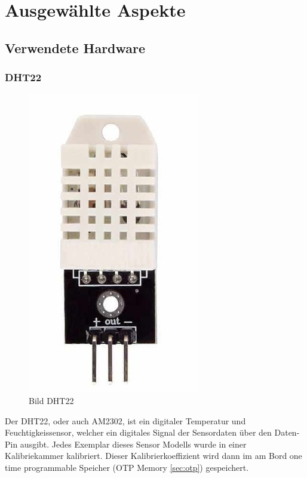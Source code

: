 \chapter{Ausgewählte Aspekte}

\section{Verwendete Hardware}

\subsection{DHT22}

\begin{figure}[H]
    \begin{center}
        \includegraphics[scale=1]{images/dht22.png}
        \caption{Bild DHT22 \cite{dht22_picture}}
    \end{center}    
\end{figure}



Der DHT22, oder auch AM2302, ist ein digitaler Temperatur und Feuchtigkeissensor, welcher ein digitales Signal der Sensordaten über den Daten-Pin ausgibt. Jedes Exemplar dieses Sensor Modells wurde in einer Kalibriekammer kalibriert. Dieser Kalibrierkoeffizient wird dann im am Bord one time programmable Speicher (OTP Memory \ref{sec:otp}) gespeichert.
\pagebreak

